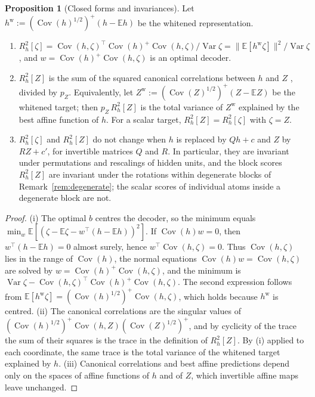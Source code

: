 \documentclass[11pt]{article}
\newcommand{\E}{\mathbb{E}}
\newcommand{\norm}[1]{\lVert #1\rVert}
\newcommand{\Cov}{\operatorname{Cov}}
\newcommand{\Var}{\operatorname{Var}}
\theoremstyle{definition}
\newtheorem{proposition}[theorem]{Proposition}
\numberwithin{equation}{section}
\begin{document}
\begin{proposition}[Closed forms and invariances]\label{prop:probe}
Let $h^{\mathrm w}:=(\Cov(h)^{1/2})^+(h-\E h)$ be the whitened representation.
\begin{enumerate}[label=(\roman*),nosep]
\item $R^2_h[\zeta]=\Cov(h,\zeta)^\top\Cov(h)^+\Cov(h,\zeta)/\Var\zeta=\norm{\E[h^{\mathrm w}\zeta]}^2/\Var\zeta$, and $w=\Cov(h)^+\Cov(h,\zeta)$ is an optimal decoder.
\item $R^2_h[Z]$ is the sum of the squared canonical correlations between $h$ and $Z$ \citep{hotelling1936relations}, divided by $p_Z$. Equivalently, let $Z^{\mathrm w}:=(\Cov(Z)^{1/2})^+(Z-\E Z)$ be the whitened target; then $p_Z\,R^2_h[Z]$ is the total variance of $Z^{\mathrm w}$ explained by the best affine function of $h$. For a scalar target, $R^2_h[Z]=R^2_h[\zeta]$ with $\zeta=Z$.
\item $R^2_h[\zeta]$ and $R^2_h[Z]$ do not change when $h$ is replaced by $Qh+c$ and $Z$ by $RZ+c'$, for invertible matrices $Q$ and $R$. In particular, they are invariant under permutations and rescalings of hidden units, and the block scores $R^2_h[Z]$ are invariant under the rotations within degenerate blocks of Remark~\ref{rem:degenerate}; the scalar scores of individual atoms inside a degenerate block are not.
\end{enumerate}
\end{proposition}

\begin{proof}
(i) The optimal $b$ centres the decoder, so the minimum equals $\min_w\E[(\zeta-\E\zeta-w^\top(h-\E h))^2]$. If $\Cov(h)w=0$, then $w^\top(h-\E h)=0$ almost surely, hence $w^\top\Cov(h,\zeta)=0$. Thus $\Cov(h,\zeta)$ lies in the range of $\Cov(h)$, the normal equations $\Cov(h)w=\Cov(h,\zeta)$ are solved by $w=\Cov(h)^+\Cov(h,\zeta)$, and the minimum is $\Var\zeta-\Cov(h,\zeta)^\top\Cov(h)^+\Cov(h,\zeta)$. The second expression follows from $\E[h^{\mathrm w}\zeta]=(\Cov(h)^{1/2})^+\Cov(h,\zeta)$, which holds because $h^{\mathrm w}$ is centred. (ii) The canonical correlations are the singular values of $(\Cov(h)^{1/2})^+\Cov(h,Z)(\Cov(Z)^{1/2})^+$, and by cyclicity of the trace the sum of their squares is the trace in the definition of $R^2_h[Z]$. By (i) applied to each coordinate, the same trace is the total variance of the whitened target explained by $h$. (iii) Canonical correlations and best affine predictions depend only on the spaces of affine functions of $h$ and of $Z$, which invertible affine maps leave unchanged.
\end{proof}
\end{document}
